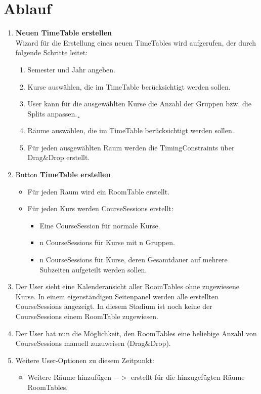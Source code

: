 \documentclass{article}
\begin{document}
	\section{Ablauf}
	\begin{enumerate}
		\item \textbf{Neuen TimeTable erstellen}\\
		Wizard für die Erstellung eines neuen TimeTables wird aufgerufen, der durch folgende Schritte leitet:
		\begin{enumerate}
			\item Semester und Jahr angeben.
			\item Kurse auswählen, die im TimeTable berücksichtigt werden sollen.
			\item User kann für die ausgewählten Kurse die Anzahl der Gruppen bzw. die Splits anpassen.¸
			\item Räume auswählen, die im TimeTable berücksichtigt werden sollen.
			\item Für jeden ausgewählten Raum werden die TimingConstraints über Drag\&Drop erstellt. 
		\end{enumerate}
		\item Button \textbf{TimeTable erstellen}
		\begin{itemize}
			\item Für jeden Raum wird ein RoomTable erstellt.
			\item Für jeden Kurs werden CourseSessions erstellt:
			\begin{itemize}
				\item Eine CourseSession für normale Kurse.
				\item n CourseSessions für Kurse mit n Gruppen.
				\item n CourseSessions für Kurse, deren Gesamtdauer auf mehrere Subzeiten aufgeteilt werden sollen. 
			\end{itemize}
		\end{itemize}
		\item Der User sieht eine Kalenderansicht aller RoomTables ohne zugewiesene Kurse. In einem eigenständigen Seitenpanel werden alle erstellten CourseSessions angezeigt. In diesem Stadium ist noch keine der CourseSessions einem RoomTable zugewiesen.
		\item Der User hat nun die Möglichkeit, den RoomTables eine beliebige Anzahl von CourseSessions manuell zuzuweisen (Drag\&Drop).
		\item Weitere User-Optionen zu diesem Zeitpunkt:
		\begin{itemize}
			\item Weitere Räume hinzufügen $->$ erstellt für die hinzugefügten Räume RoomTables.

\end{itemize}
\end{enumerate}
\end{document}
